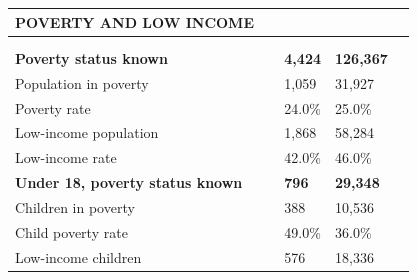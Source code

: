 \documentclass[9pt]{report}
\begin{document}
\vspace{12pt}
\setlength{\tabcolsep}{.01in} %
\begin{tabular}{p{.10in}p{.10in}p{.10in}p{3.7in}>{\hfill}p{.85in}>{\hfill}p{.85in}>{\hfill}p{.85in}>{\hfill}p{.85in}p{0.1in}}
\multicolumn{9}{l}{\parbox{7.1in}{\raggedright{\large{\strut\textbf{POVERTY AND LOW INCOME}\strut}}}} \\ 
\hline
\multicolumn{4}{l}{\parbox{3.5in}{\raggedright{\textbf{}}}} & \multicolumn{1}{r}{\parbox{.85in}{\strut\raggedleft{\textbf{}\strut}}} & \multicolumn{1}{r}{\parbox{.85in}{\strut\raggedleft{\textbf{}\strut}}} & \multicolumn{1}{r}{\parbox{.85in}{\strut{}}} & \multicolumn{1}{r}{\parbox{.85in}{\strut{}}} & \\ 
\multicolumn{9}{l}{} \\ 
\multicolumn{4}{l}{\parbox{3.5in}{\strut\raggedright{\textbf{Poverty status known}\strut}}} & \textbf{} & \textbf{} & \textbf{4,424} & \textbf{126,367} & \textbf{} \\ 
\multicolumn{4}{l}{\parbox{3.6in}{\strut\raggedright{{Population in poverty}}\strut}} &  &  & 1,059 & 31,927 & \multicolumn{1}{l}{}  \\ 
\multicolumn{4}{l}{\parbox{3.6in}{\strut\raggedright{{Poverty rate}}\strut}} &  &  & 24.0\% & 25.0\% & \multicolumn{1}{l}{}  \\ 
\multicolumn{4}{l}{\parbox{3.6in}{\strut\raggedright{{Low-income population}}\strut}} &  &  & 1,868 & 58,284 & \multicolumn{1}{l}{}  \\ 
\multicolumn{4}{l}{\parbox{3.6in}{\strut\raggedright{{Low-income rate}}\strut}} &  &  & 42.0\% & 46.0\% & \multicolumn{1}{l}{}  \\ 
\multicolumn{4}{l}{\parbox{3.5in}{\strut\raggedright{\textbf{Under 18, poverty status known}\strut}}} & \textbf{} & \textbf{} & \textbf{796} & \textbf{29,348} & \textbf{} \\ 
\multicolumn{4}{l}{\parbox{3.6in}{\strut\raggedright{{Children in poverty}}\strut}} &  &  & 388 & 10,536 & \multicolumn{1}{l}{}  \\ 
\multicolumn{4}{l}{\parbox{3.6in}{\strut\raggedright{{Child poverty rate}}\strut}} &  &  & 49.0\% & 36.0\% & \multicolumn{1}{l}{}  \\ 
\multicolumn{4}{l}{\parbox{3.6in}{\strut\raggedright{{Low-income children}}\strut}} &  &  & 576 & 18,336 & \multicolumn{1}{l}{}  \\ 

\end{tabular}
\end{document}
